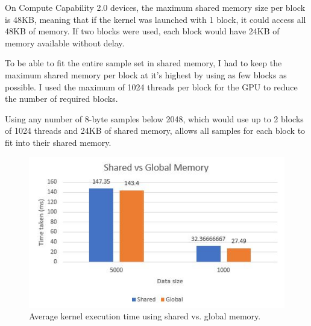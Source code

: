 \documentclass[11pt,a4paper]{article}
\begin{document}
On Compute Capability 2.0 devices, the maximum shared memory size per block is 48KB, meaning that if the kernel was launched with 1 block, it could access all 48KB of memory. If two blocks were used, each block would have 24KB of memory available without delay.

\begin{figure}[H]%
    \centering
    \qquad
    \vspace{5pt}
    \caption{}
    \label{fig:code_cuda_all}%
\end{figure}

To be able to fit the entire sample set in shared memory, I had to keep the maximum shared memory per block at it's highest by using as few blocks as possible. I used the maximum of 1024 threads per block for the GPU to reduce the number of required blocks.

Using any number of 8-byte samples below 2048, which would use up to 2 blocks of 1024 threads and 24KB of shared memory, allows all samples for each block to fit into their shared memory. 

\begin{figure}
\begin{center}
\includegraphics[scale=0.6]{shared_vs_global_graph}
\end{center}
\caption{Average kernel execution time using shared vs. global memory.}
\label{fig:shared_vs_global_graph}
\end{figure}
\end{document}
